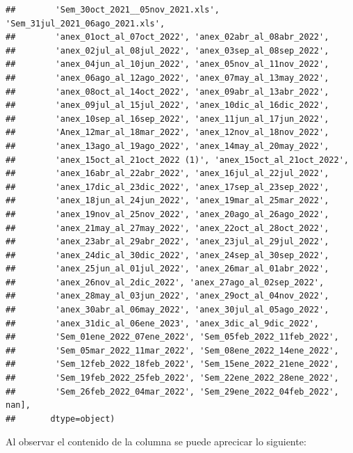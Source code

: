 \documentclass[
]{book}
\begin{document}
\begin{verbatim}
##        'Sem_30oct_2021__05nov_2021.xls', 'Sem_31jul_2021_06ago_2021.xls',
##        'anex_01oct_al_07oct_2022', 'anex_02abr_al_08abr_2022',
##        'anex_02jul_al_08jul_2022', 'anex_03sep_al_08sep_2022',
##        'anex_04jun_al_10jun_2022', 'anex_05nov_al_11nov_2022',
##        'anex_06ago_al_12ago_2022', 'anex_07may_al_13may_2022',
##        'anex_08oct_al_14oct_2022', 'anex_09abr_al_13abr_2022',
##        'anex_09jul_al_15jul_2022', 'anex_10dic_al_16dic_2022',
##        'anex_10sep_al_16sep_2022', 'anex_11jun_al_17jun_2022',
##        'Anex_12mar_al_18mar_2022', 'anex_12nov_al_18nov_2022',
##        'anex_13ago_al_19ago_2022', 'anex_14may_al_20may_2022',
##        'anex_15oct_al_21oct_2022 (1)', 'anex_15oct_al_21oct_2022',
##        'anex_16abr_al_22abr_2022', 'anex_16jul_al_22jul_2022',
##        'anex_17dic_al_23dic_2022', 'anex_17sep_al_23sep_2022',
##        'anex_18jun_al_24jun_2022', 'anex_19mar_al_25mar_2022',
##        'anex_19nov_al_25nov_2022', 'anex_20ago_al_26ago_2022',
##        'anex_21may_al_27may_2022', 'anex_22oct_al_28oct_2022',
##        'anex_23abr_al_29abr_2022', 'anex_23jul_al_29jul_2022',
##        'anex_24dic_al_30dic_2022', 'anex_24sep_al_30sep_2022',
##        'anex_25jun_al_01jul_2022', 'anex_26mar_al_01abr_2022',
##        'anex_26nov_al_2dic_2022', 'anex_27ago_al_02sep_2022',
##        'anex_28may_al_03jun_2022', 'anex_29oct_al_04nov_2022',
##        'anex_30abr_al_06may_2022', 'anex_30jul_al_05ago_2022',
##        'anex_31dic_al_06ene_2023', 'anex_3dic_al_9dic_2022',
##        'Sem_01ene_2022_07ene_2022', 'Sem_05feb_2022_11feb_2022',
##        'Sem_05mar_2022_11mar_2022', 'Sem_08ene_2022_14ene_2022',
##        'Sem_12feb_2022_18feb_2022', 'Sem_15ene_2022_21ene_2022',
##        'Sem_19feb_2022_25feb_2022', 'Sem_22ene_2022_28ene_2022',
##        'Sem_26feb_2022_04mar_2022', 'Sem_29ene_2022_04feb_2022', nan],
##       dtype=object)
\end{verbatim}

Al observar el contenido de la columna se puede aprecicar lo siguiente:
\end{document}
